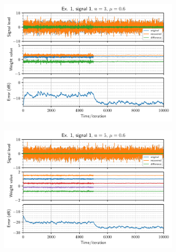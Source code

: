 \begin{figure}[h]
    \centering
    \begin{subfigure}[t]{0.30\columnwidth}
        \centering
        \includegraphics[width=\columnwidth]{figures/pdf/ex1_l1_n3_mu60.pdf}
        \caption{}
    \end{subfigure} \hfill
    \begin{subfigure}[t]{0.30\columnwidth}
        \centering
        \includegraphics[width=\columnwidth]{figures/pdf/ex1_l1_n5_mu60.pdf}
        \caption{}
    \end{subfigure} \hfill
    \begin{subfigure}[t]{0.30\columnwidth}
        \centering

\end{subfigure}
\end{figure}
